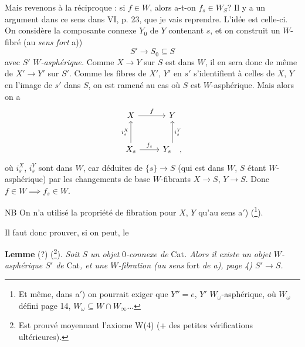 Mais revenons à la réciproque : si $f \in W$, alors a-t-on $f_s \in W_S$? Il y a un argument dans ce sens dans VI, p. 23, que je vais reprendre. L'idée est celle-ci. On considère la composante connexe $Y_0$ de $Y$ contenant $s$, et on construit un
$W$-fibré (au \textit{sens fort} a))
\[ S' \longrightarrow S_0 \subseteq S \]
avec $S'$ \textit{$W$-asphérique.} Comme $X \longrightarrow Y$ sur $S$ est dans $W$, il en sera donc de même de $X' \longrightarrow Y'$ sur $S'$. Comme les fibres de $X'$, $Y'$ en $s'$ s'identifient à celles de $X$, $Y$ en l'image de $s'$ dans $S$, on est ramené au cas où $S$ est $W$-asphérique. Mais alors on a
\[
\begin{tikzcd}[row sep=large]
X \arrow[r, "f"] & Y \\
X_s \arrow[u, "i_s^X"] \arrow[r, "f_s"] & Y_s \arrow[u, "i_s^Y"'] \quad ,
\end{tikzcd}
\]
où $i_s^X$, $i_s^Y$ sont dans $W$, car déduites de $\{s\} \longrightarrow S$ (qui est dans $W$, $S$ étant $W$-asphérique) par les changements de base $W$-fibrants $X \longrightarrow S$, $Y \longrightarrow S$. Donc $f \in W \implies f_s \in W$.

NB On n'a utilisé la propriété de fibration pour $X$, $Y$ qu'au sens a$'$) (\footnote[10]{Et même, dans a$'$) on pourrait exiger que $Y'' = e$, $Y'$ $W_\omega$-asphérique, où $W_\omega$ défini page 14, $W_\omega \subseteq W \cap W_\infty \ldots$}).

Il faut donc prouver, si on peut, le

\textbf{Lemme} (?) (\footnote[11]{Est prouvé moyennant l'axiome W(4) (+ des petites vérifications ultérieures).}). \textit{Soit $S$ un objet} $0$\textit{-connexe de} Cat\textit{. Alors il existe un objet $W$-asphérique $S'$ de} Cat\textit{, et une $W$-fibration (au sens} fort \textit{de a), page 4) $S' \longrightarrow S$.}

